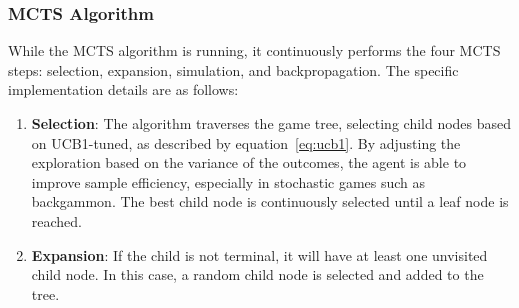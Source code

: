 \subsubsection{MCTS Algorithm}
While the MCTS algorithm is running, it continuously performs the four MCTS steps: selection, expansion, simulation, and backpropagation. The specific implementation details are as follows:
\begin{enumerate}
    \item \textbf{Selection}: The algorithm traverses the game tree, selecting child nodes based on UCB1-tuned, as described by equation~\ref{eq:ucb1}. By adjusting the exploration based on the variance of the outcomes, the agent is able to improve sample efficiency, especially in stochastic games such as backgammon. The best child node is continuously selected until a leaf node is reached. 
    
    \item \textbf{Expansion}: If the child is not terminal, it will have at least one unvisited child node. In this case, a random child node is selected and added to the tree.
    

\end{enumerate}
